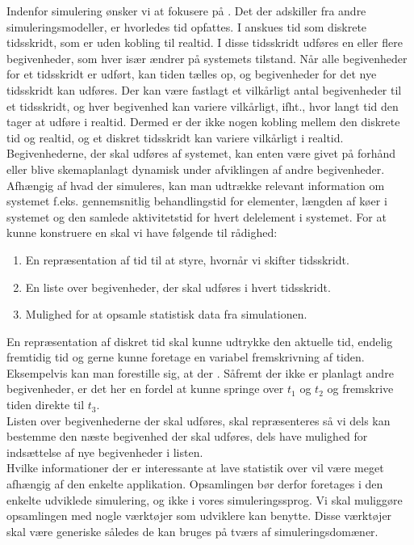 Indenfor simulering ønsker vi at fokusere på \des. Det der adskiller \des fra andre simuleringsmodeller, er hvorledes tid opfattes. I \des anskues tid som diskrete tidsskridt, som er uden kobling til realtid. I disse tidsskridt udføres en eller flere begivenheder, som hver især ændrer på systemets tilstand. Når alle begivenheder for et tidsskridt er udført, kan tiden tælles op, og begivenheder for det nye tidsskridt kan udføres. Der kan være fastlagt et vilkårligt antal begivenheder til et tidsskridt, og hver begivenhed kan variere vilkårligt, ifht., hvor langt tid den tager at udføre i realtid. Dermed er der ikke nogen kobling mellem den diskrete tid og realtid, og et diskret tidsskridt kan variere vilkårligt i realtid. Begivenhederne, der skal udføres af systemet, kan enten være givet på forhånd eller blive skemaplanlagt dynamisk under afviklingen af andre begivenheder. 
Afhængig af hvad der simuleres, kan man udtrække relevant information om systemet f.eks. gennemsnitlig behandlingstid for elementer, længden af køer i systemet og den samlede aktivitetstid for hvert delelement i systemet.
For at kunne konstruere en \des skal vi have følgende til rådighed:
\begin{enumerate}
\tightlist 
\item En repræsentation af tid til at styre, hvornår vi skifter tidsskridt.
\item En liste over begivenheder, der skal udføres i hvert tidsskridt.
\item Mulighed for at opsamle statistisk data fra simulationen. 
\end{enumerate}
En repræsentation af diskret tid skal kunne udtrykke den aktuelle tid, endelig fremtidig tid og gerne kunne foretage en variabel fremskrivning af tiden. Eksempelvis kan man forestille sig, at der . Såfremt der ikke er planlagt andre begivenheder, er det her en fordel at kunne springe over $t_{1}$ og $t_{2}$ og fremskrive tiden direkte til $t_{3}$. \\
Listen over begivenhederne der skal udføres, skal repræsenteres så vi dels kan bestemme den næste begivenhed der skal udføres, dels have mulighed for indsættelse af nye begivenheder i listen. \\
Hvilke informationer der er interessante at lave statistik over vil være meget afhængig af den enkelte applikation. Opsamlingen bør derfor foretages i den enkelte udviklede simulering, og ikke i vores simuleringssprog. Vi skal muliggøre opsamlingen med nogle værktøjer som udviklere kan benytte. Disse værktøjer skal være generiske således de kan bruges på tværs af simuleringsdomæner. 


